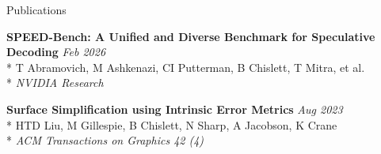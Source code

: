 \documentclass[11pt, letterpaper]{article}
\begin{document}
\begin{section}{Publications}

\textbf{SPEED-Bench: A Unified and Diverse Benchmark for Speculative Decoding}
\hfill \textit{Feb 2026}\\*
T Abramovich, M Ashkenazi, CI Putterman, B Chislett, T Mitra, et al.\\*
\textit{NVIDIA Research}

\vspace{0.5em}

\textbf{Surface Simplification using Intrinsic Error Metrics}
\hfill \textit{Aug 2023}\\*
HTD Liu, M Gillespie, B Chislett, N Sharp, A Jacobson, K Crane\\*
\textit{ACM Transactions on Graphics 42 (4)}

\end{section}
\end{document}
